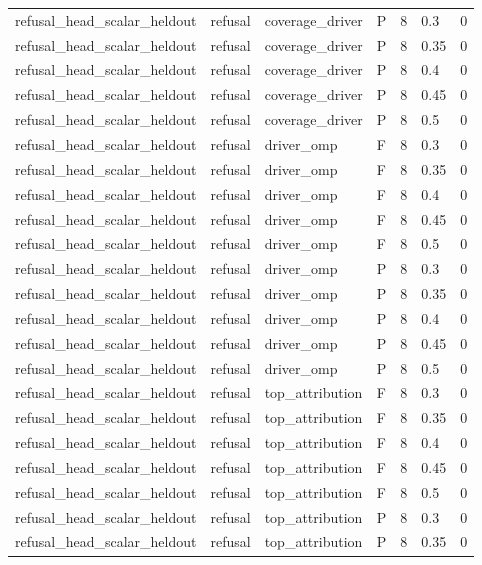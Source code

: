 \begin{tabular}{lllllll}
refusal\_head\_scalar\_heldout & refusal & coverage\_driver & P & 8 & 0.3 & 0 \\
refusal\_head\_scalar\_heldout & refusal & coverage\_driver & P & 8 & 0.35 & 0 \\
refusal\_head\_scalar\_heldout & refusal & coverage\_driver & P & 8 & 0.4 & 0 \\
refusal\_head\_scalar\_heldout & refusal & coverage\_driver & P & 8 & 0.45 & 0 \\
refusal\_head\_scalar\_heldout & refusal & coverage\_driver & P & 8 & 0.5 & 0 \\
refusal\_head\_scalar\_heldout & refusal & driver\_omp & F & 8 & 0.3 & 0 \\
refusal\_head\_scalar\_heldout & refusal & driver\_omp & F & 8 & 0.35 & 0 \\
refusal\_head\_scalar\_heldout & refusal & driver\_omp & F & 8 & 0.4 & 0 \\
refusal\_head\_scalar\_heldout & refusal & driver\_omp & F & 8 & 0.45 & 0 \\
refusal\_head\_scalar\_heldout & refusal & driver\_omp & F & 8 & 0.5 & 0 \\
refusal\_head\_scalar\_heldout & refusal & driver\_omp & P & 8 & 0.3 & 0 \\
refusal\_head\_scalar\_heldout & refusal & driver\_omp & P & 8 & 0.35 & 0 \\
refusal\_head\_scalar\_heldout & refusal & driver\_omp & P & 8 & 0.4 & 0 \\
refusal\_head\_scalar\_heldout & refusal & driver\_omp & P & 8 & 0.45 & 0 \\
refusal\_head\_scalar\_heldout & refusal & driver\_omp & P & 8 & 0.5 & 0 \\
refusal\_head\_scalar\_heldout & refusal & top\_attribution & F & 8 & 0.3 & 0 \\
refusal\_head\_scalar\_heldout & refusal & top\_attribution & F & 8 & 0.35 & 0 \\
refusal\_head\_scalar\_heldout & refusal & top\_attribution & F & 8 & 0.4 & 0 \\
refusal\_head\_scalar\_heldout & refusal & top\_attribution & F & 8 & 0.45 & 0 \\
refusal\_head\_scalar\_heldout & refusal & top\_attribution & F & 8 & 0.5 & 0 \\
refusal\_head\_scalar\_heldout & refusal & top\_attribution & P & 8 & 0.3 & 0 \\
refusal\_head\_scalar\_heldout & refusal & top\_attribution & P & 8 & 0.35 & 0 \\

\end{tabular}
